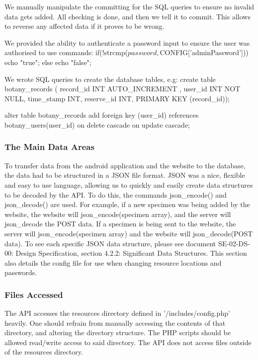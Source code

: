 We manually manipulate the committing for the SQL queries to ensure no invalid data gets added. All checking is done, and then we tell it to commit. This allows to reverse any affected data if it proves to be wrong.

We provided the ability to authenticate a password input to ensure the user was authorised to use commands:
if(!strcmp($password, $CONFIG['adminPassword']))	
{
	echo "true";
}
else
{
	echo "false";
}

We wrote SQL queries to create the database tables, e.g:
create table botany_records ( 
    record_id INT AUTO_INCREMENT , 
    user_id INT NOT NULL, 
    time_stamp INT,
    reserve_id INT,
    PRIMARY KEY (record_id));
		
		alter table botany_records
    add foreign key (user_id)  
    references botany_users(user_id)  
    on delete cascade on update cascade;

    \subsubsection{The Main Data Areas}


To transfer data from the android application and the website to the database,  the data had to be structured in a JSON file format. JSON was a nice, flexible and easy to use language, allowing us 
to quickly and easily create data structures to be decoded by the API. To do this, the commands json_encode() and json_decode() are used. For example, if a new specimen was being added by the website, 
the website will json_encode(specimen array), and the server will json_decode the POST data. If a specimen is being sent to the website, the server will json_encode(specimen array) and the website 
will json_decode(POST data). To see each specific JSON data structure, please see document SE-02-DS-00: Design Specification, section 4.2.2: Significant Data Structures. This section also details 
the config file for use when changing resource locations and passwords. 

    \subsubsection{Files Accessed}

 	The API accesses the resources directory defined in '/includes/config.php'
	heavily. One should refrain from manually accessing the contents of that
	directory, and altering the directory structure. The PHP scripts should
	be allowed read/write access to said directory.
	The API does not access files outside of the resources directory.

